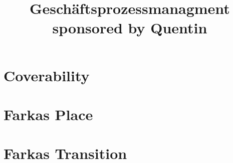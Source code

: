 \documentclass{article}
\title{Geschäftsprozessmanagment sponsored by Quentin}
\begin{document}
\maketitle
\section{Coverability}

\section{Farkas Place}

\section{Farkas Transition}

\end{document}
